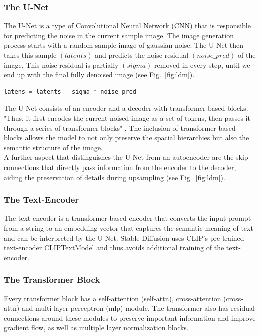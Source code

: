 \subsubsection{The U-Net}
The U-Net \cite{ronneberger2015u} is a type of Convolutional Neural Network (CNN) that is responsible for predicting the noise in the current sample image. The image generation process starts with a random sample image of gaussian noise. The U-Net then takes this sample \((latents)\) and predicts the noise residual \((noise\_pred)\) of the image. 
This noise residual is partially \((sigma)\) removed in every step, until we end up with the final fully denoised image (see Fig.~\ref{fig:ldm}).
\begin{lstlisting}[language=Python]
latens = latents - sigma * noise_pred
\end{lstlisting}
The U-Net consists of an encoder and a decoder with transformer-based blocks. "Thus, it first encodes the current noised image as a set of tokens, then passes it through a series of transformer blocks" \cite{bolya2023tomesd}. The inclusion of transformer-based blocks allows the model to not only preserve the spacial hierarchies but also the semantic structure of the image.\\
A further aspect that distinguishes the U-Net from an autoencoder are the skip connections that directly pass information from the encoder to the decoder, aiding the preservation of details during upsampling (see Fig.~\ref{fig:ldm}).



\subsubsection{The Text-Encoder}
The text-encoder is a transformer-based encoder that converts the input prompt from a string to an embedding vector that captures the semantic meaning of text and can be interpreted by the U-Net. Stable Diffusion uses CLIP's \cite{radford2021learning} pre-trained text-encoder \href{https://huggingface.co/docs/transformers/model_doc/clip#transformers.CLIPTextModel}{CLIPTextModel} and thus avoids additional training of the text-encoder.



\subsubsection{The Transformer Block}
Every transformer block has a self-attention (self-attn), cross-attention (cross-attn) and multi-layer perceptron (mlp) module.
The transformer also has residual connections around these modules to preserve important information and improve gradient flow, as well as multiple layer normalization blocks.




